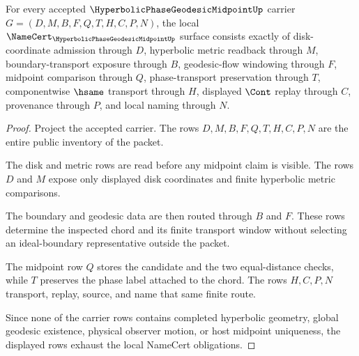 \begin{theorem}
\label{thm:hyperbolic-phase-geodesic-midpoint-namecert-obligations}
For every accepted $\HyperbolicPhaseGeodesicMidpointUp$ carrier $G=(D,M,B,F,Q,T,H,C,P,N)$, the local $\NameCert_{\HyperbolicPhaseGeodesicMidpointUp}$ surface consists exactly of disk-coordinate admission through $D$, hyperbolic metric readback through $M$, boundary-transport exposure through $B$, geodesic-flow windowing through $F$, midpoint comparison through $Q$, phase-transport preservation through $T$, componentwise $\hsame$ transport through $H$, displayed $\Cont$ replay through $C$, provenance through $P$, and local naming through $N$.
\end{theorem}
\begin{proof}
Project the accepted carrier. The rows $D,M,B,F,Q,T,H,C,P,N$ are the entire public inventory of the packet.

The disk and metric rows are read before any midpoint claim is visible. The rows $D$ and $M$ expose only displayed disk coordinates and finite hyperbolic metric comparisons.

The boundary and geodesic data are then routed through $B$ and $F$. These rows determine the inspected chord and its finite transport window without selecting an ideal-boundary representative outside the packet.

The midpoint row $Q$ stores the candidate and the two equal-distance checks, while $T$ preserves the phase label attached to the chord. The rows $H,C,P,N$ transport, replay, source, and name that same finite route.

Since none of the carrier rows contains completed hyperbolic geometry, global geodesic existence, physical observer motion, or host midpoint uniqueness, the displayed rows exhaust the local NameCert obligations.
\end{proof}

